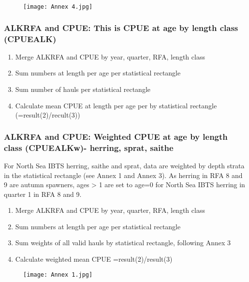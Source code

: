 \documentclass[useAMS,referee]{biom}
\numberwithin{equation}{section}
\begin{document}
\begin{figure}[h!]
\centering
\texttt{[image: Annex 4.jpg]}
\end{figure}



\subsubsection{ALKRFA and CPUE: This is CPUE at age by length class (CPUEALK)} 
\begin{enumerate}
\item Merge ALKRFA and CPUE by year, quarter, RFA, length class 
\item Sum numbers at length per age per statistical rectangle
\item Sum number of hauls per statistical rectangle 
\item  Calculate mean CPUE at length per age per by statistical rectangle (=result(2)/recult(3)) 
\end{enumerate}

\subsubsection{ALKRFA and CPUE: Weighted CPUE at age by length class (CPUEALKw)- herring, sprat, saithe}
For North Sea IBTS herring, saithe and sprat, data are weighted by depth strata in the statistical rectangle (see Annex 1 and Annex 3). As herring in RFA 8 and 9 are autumn spawners, ages > 1 are set to age=0 for North Sea IBTS herring in quarter 1 in RFA 8 and 9. 

\begin{enumerate}
\item Merge ALKRFA and CPUE by year, quarter, RFA, length class  
\item Sum numbers at length per age per statistical rectangle 
\item  Sum weights of all valid hauls by statistical rectangle, following Annex 3 \item Calculate weighted mean CPUE =result(2)/result(3) 
\end{enumerate}


\begin{figure}[h!]
\centering
\texttt{[image: Annex 1.jpg]}
\end{figure}
\end{document}
